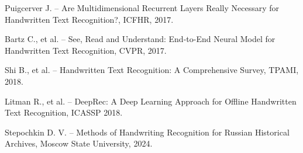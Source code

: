 \documentclass{extarticle}
\begin{document}
\begin{thebibliography}{00}
	Puigcerver J. -- Are Multidimensional Recurrent Layers Really Necessary for Handwritten Text Recognition?, ICFHR, 2017.
	
	Bartz C., et al. -- See, Read and Understand: End-to-End Neural Model for Handwritten Text Recognition, CVPR, 2017.
	
	Shi B., et al. -- Handwritten Text Recognition: A Comprehensive Survey, TPAMI, 2018.
	
	Litman R., et al. -- DeepRec: A Deep Learning Approach for Offline Handwritten Text Recognition, ICASSP 2018.
	
	Stepochkin D. V. -- Methods of Handwriting Recognition for Russian Historical Archives, Moscow State University, 2024.
\end{thebibliography}



	
	
\end{document}
